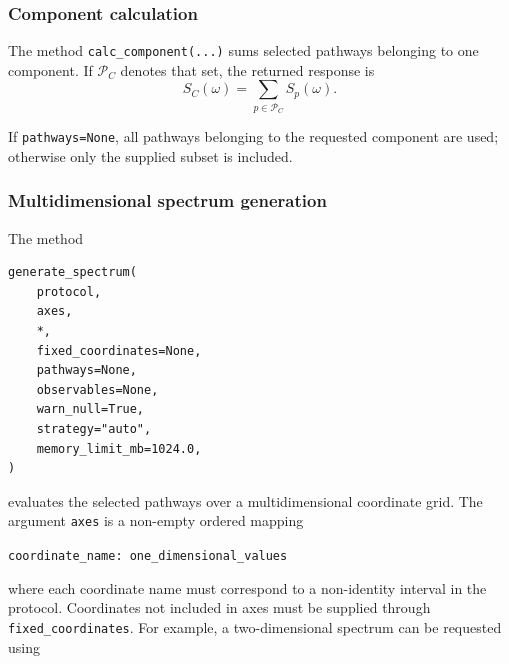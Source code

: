\documentclass[11pt]{article}
\begin{document}
\subsubsection{Component calculation}

The method \texttt{calc\_component(...)} sums selected pathways belonging to one component. If $\mathcal{P}_C$ denotes that set, the returned response is
\begin{equation}
    S_C(\omega)=\sum_{p\in\mathcal{P}_C}S_p(\omega).
\end{equation}

If \texttt{pathways=None}, all pathways belonging to the requested component are used; otherwise only the supplied subset is included.

\subsubsection{Multidimensional spectrum generation}

The method 
\begin{verbatim}
generate_spectrum(
    protocol,
    axes,
    *,
    fixed_coordinates=None,
    pathways=None,
    observables=None,
    warn_null=True,
    strategy="auto",
    memory_limit_mb=1024.0,
)
\end{verbatim}
evaluates the selected pathways over a multidimensional coordinate grid. The argument \texttt{axes} is a non-empty ordered mapping
\newline

\texttt{coordinate\_name: one\_dimensional\_values}
\newline

where each coordinate name must correspond to a non-identity interval in the protocol. Coordinates not included in axes must be supplied through \texttt{fixed\_coordinates}.
\newline
For example, a two-dimensional spectrum can be requested using
\end{document}
